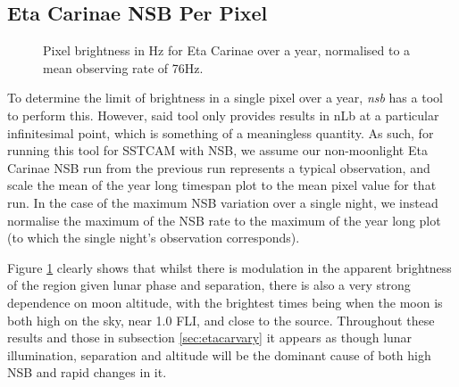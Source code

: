 \subsection{Eta Carinae NSB Per Pixel}
\label{sec:etacartimespan}
\begin{figure}[ht]
\begin{centering}
\caption{Pixel brightness in Hz for Eta Carinae over a year, normalised to a mean observing rate of 76Hz.}
\label{fig:etacar_timespan}
\end{centering}
\end{figure}

To determine the limit of brightness in a single pixel over a year, \textit{nsb} has a tool to perform this. However, said tool only provides results in nLb at a particular infinitesimal point, which is something of a meaningless quantity. As such, for running this tool for SSTCAM with NSB, we assume our non-moonlight Eta Carinae NSB run from the previous run represents a typical observation, and scale the mean of the year long timespan plot to the mean pixel value for that run. In the case of the maximum NSB variation over a single night, we instead normalise the maximum of the NSB rate to the maximum of the year long plot (to which the single night's observation corresponds).

Figure \ref{fig:etacar_timespan} clearly shows that whilst there is modulation in the apparent brightness of the region given lunar phase and separation, there is also a very strong dependence on moon altitude, with the brightest times being when the moon is both high on the sky, near 1.0 FLI, and close to the source. Throughout these results and those in subsection \ref{sec:etacarvary} it appears as though lunar illumination, separation and altitude will be the dominant cause of both high NSB and rapid changes in it.

